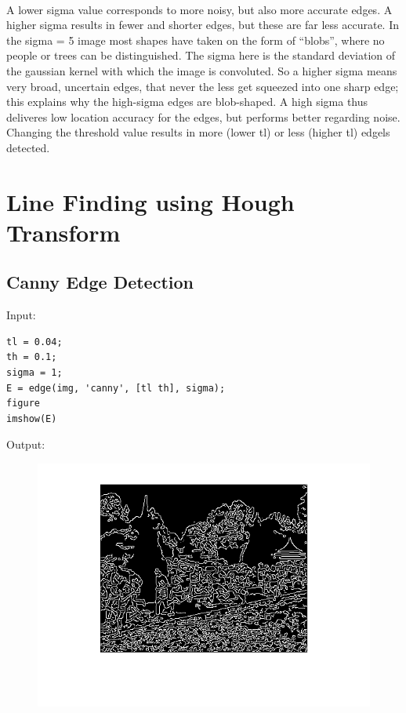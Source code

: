 \documentclass[12pt, a4paper]{article}
\begin{document}
~\\[-20mm]
A lower sigma value corresponds to more noisy, but also more accurate edges. A higher sigma results in fewer and shorter edges, but these are far less accurate. In the sigma = 5 image most shapes have taken on the form of ``blobs'', where no people or trees can be distinguished. The sigma here is the standard deviation of the gaussian kernel with which the image is convoluted. So a higher sigma means very broad, uncertain edges, that never the less get squeezed into one sharp edge; this explains why the high-sigma edges are blob-shaped. A high sigma thus deliveres low location accuracy for the edges, but performs better regarding noise.
Changing the threshold value results in more (lower tl) or less (higher tl) edgels detected.
\newpage
\section{Line Finding using Hough Transform}
\subsection{Canny Edge Detection}
Input:
\begin{verbatim}
tl = 0.04;
th = 0.1;
sigma = 1;
E = edge(img, 'canny', [tl th], sigma);
figure
imshow(E)
\end{verbatim}
Output:
\begin{figure}[H]
	\centering
	\includegraphics[width=\textwidth]{fig14.png}
\end{figure}
\end{document}
